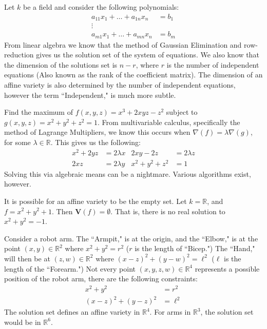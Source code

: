\documentclass[crop=false,class=book,oneside]{standalone}
\begin{document}
\begin{example}
Let $k$ be a field and consider the following polynomials:
\begin{align*}
    a_{11}x_{1}+\hdots+a_{1n}x_{n}&=b_{1}\\
    \vdots&\\
    a_{m1}x_{1}+\hdots+a_{mn}x_{n}&=b_{m}
\end{align*}
From linear algebra we know that the method of Gaussian Elimination and row-reduction gives us the solution set of the system of equations. We also know that the dimension of the solutions set is $n-r$, where $r$ is the number of independent equations (Also known as the rank of the coefficient matrix). The dimension of an affine variety is also determined by the number of independent equations, however the term ``Independent," is much more subtle.
\end{example}
\begin{example}
Find the maximum of $f(x,y,z) = x^3+2xyz-z^2$ subject to $g(x,y,z) = x^2+y^2+z^2=1$. From multivariable calculus, specifically the method of Lagrange Multipliers, we know this occurs when $\nabla(f) = \lambda \nabla(g)$, for some $\lambda \in \mathbb{R}$. This gives us the following:
\begin{align*}
    x^{2}+2yz&=2\lambda x & 2xy-2z&=2\lambda z\\
    2xz&=2\lambda y & x^{2}+y^{2}+z^2&=1
\end{align*}
Solving this via algebraic means can be a nightmare. Various algorithms exist, however.
\end{example}
\begin{remark}
It is possible for an affine variety to be the empty set. Let $k=\mathbb{R}$, and $f=x^{2}+y^{2}+1$. Then $\mathbf{V}(f)=\emptyset$. That is, there is no real solution to $x^2+y^2 = -1$.
\end{remark}
\begin{example}
Consider a robot arm. The ``Armpit," is at the origin, and the ``Elbow," is at the point $(x,y)\in \mathbb{R}^2$ where $x^2+y^2 = r^2$ ($r$ is the length of ``Bicep.") The ``Hand," will then be at $(z,w)\in \mathbb{R}^2$ where $(x-z)^2 + (y-w)^2 = \ell^2$ ($\ell$ is the length of the ``Forearm.") Not every point $(x,y,z,w)\in \mathbb{R}^4$ represents a possible position of the robot arm, there are the following constraints:
\begin{align*}
    x^{2}+y^{2}&=r^{2}\\ 
    (x-z)^{2}+(y-z)^{2}&=\ell^{2}
\end{align*}
The solution set defines an affine variety in $\mathbb{R}^4$. For arms in $\mathbb{R}^3$, the solution set would be in $\mathbb{R}^6$.
\end{example}
\end{document}

